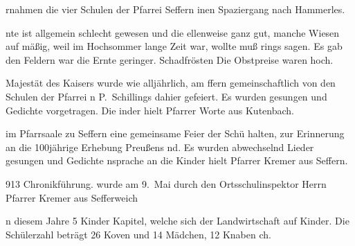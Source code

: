 

\pstart
{}%
rnahmen die vier Schulen der Pfarrei Seffern\ob
inen Spaziergang nach Hammerles.

\trenner

\pend
{}
\pstart

%
nte ist allgemein schlecht gewesen und die\ob
ellenweise ganz gut, manche Wiesen auf\ob
mäßig, weil im Hochsommer lange Zeit\ob
war, wollte muß rings sagen\unsicher. Es gab\ob
den Feldern war die Ernte geringer. Schadfrösten\unsicher\ob
Die Obstpreise waren hoch.

\trenner

\pend
{}
\pstart

%
 Majestät des Kaisers wurde wie alljährlich, am\ob
ffern gemeinschaftlich von den Schulen der Pfarrei\ob
n P.\ Schillings dahier gefeiert. Es wurden\ob
 gesungen und Gedichte vorgetragen. Die\ob
inder hielt Pfarrer Worte\unsicher{} aus Kutenbach.

\trenner

\pend
{}
\pstart

%
im Pfarrsaale zu Seffern eine gemeinsame Feier der Schü\ohb
halten, zur Erinnerung an die 100jährige Erhebung Preußens\ob
nd. Es wurden abwechselnd Lieder gesungen und Gedichte\ob
nsprache an die Kinder hielt Pfarrer Kremer aus Seffern.

%
913        Chronikführung.\ob
wurde am 9.\ Mai durch den Ortsschulinspektor Herrn Pfarrer Kremer aus Sefferweich\unsicher

\pend
{}
\pstart

%
n diesem Jahre 5 Kinder Kapitel\unsicher, welche sich der Landwirtschaft auf\ohb
Kinder. Die Schülerzahl beträgt 26 Koven\unsicher{} und 14 Mädchen, 12 Knaben\ob
ch.
\pend
